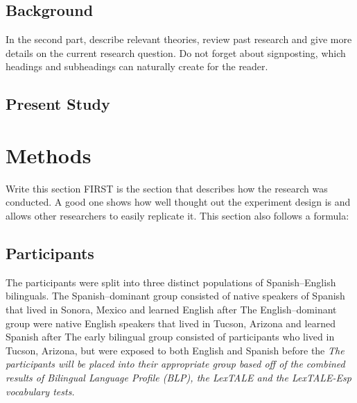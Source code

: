 \subsection{Background}

In the second part, describe relevant theories, review past research and give more details on the current research question. Do not forget about signposting, which headings and subheadings can naturally create for the reader.


\subsection{Present Study}




\section{Methods}

Write this section FIRST
is the section that describes how the research was conducted. A good one shows how well thought out the experiment design is and allows other researchers to easily replicate it. This section also follows a formula:

\subsection{Participants}

The participants were split into three distinct populations of Spanish–English bilinguals. The Spanish–dominant group consisted of native speakers of Spanish that lived in Sonora, Mexico and learned English after %
The English–dominant group were native English speakers that lived in Tucson, Arizona and learned Spanish after%
The early bilingual group consisted of participants who lived in Tucson, Arizona, but were exposed to both English and Spanish before the %
\emph{The participants will be placed into their appropriate group based off of the combined results of Bilingual Language Profile (BLP), the LexTALE and the LexTALE-Esp vocabulary tests.} 


